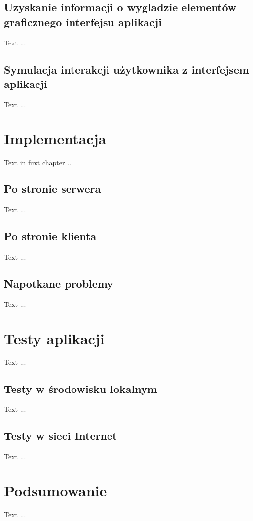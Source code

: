 \documentclass[polish]{inz}
\begin{document}
\section{Uzyskanie informacji o wygladzie elementów graficznego interfejsu aplikacji}
Text ...

\section{Symulacja interakcji użytkownika z interfejsem aplikacji}
Text ...

\chapter{Implementacja}
Text in first chapter ...

\section{Po stronie serwera}
\label{sec:implementation_server}
Text ...

\section{Po stronie klienta}
Text ...

\section{Napotkane problemy}
Text ...

\chapter{Testy aplikacji}
Text ...

\section{Testy w środowisku lokalnym}
Text ...

\section{Testy w sieci Internet}
Text ...

\chapter{Podsumowanie}
Text ...

\printindex
\end{document}
